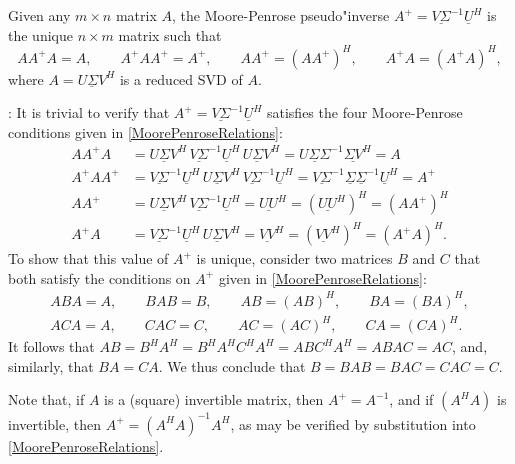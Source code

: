 \begin{fact} \label{fact.A.E.A}
Given any $m \times n$ matrix $A$, the Moore-Penrose pseudo"inverse $A^{+}=\underline{V \Sigma}^{-1} \underline{U}^{H}$
is the unique $n \times m$ matrix such that
\begin{equation}
    A A^{+} A = A, \qquad
    A^{+} A A^{+} = A^{+}, \qquad
    A A^{+} = (A A^{+})^{H}, \qquad
    A^{+} A = (A^{+} A)^{H},
    \label{MoorePenroseRelations}
\end{equation}
where $A=\underline{U \Sigma V}^{H}$ is a reduced SVD of $A$.
\end{fact}
\/: It is trivial to verify that $A^{+}=\underline{V \Sigma}^{-1} \underline{U}^{H}$ satisfies the four
Moore-Penrose conditions given in \eqref{MoorePenroseRelations}:
\begin{align*}
  A A^{+} A & = \underline{U \Sigma V}^{H} \,\underline{V \Sigma}^{-1} \underline{U}^{H}\, \underline{U \Sigma V}^{H}
              = \underline{U \Sigma \Sigma}^{-1} \underline{\Sigma V}^{H} = A\\
  A^{+} A A^{+} &= \underline{V \Sigma}^{-1} \underline{U}^{H}\, \underline{U \Sigma V}^{H}\,\underline{V \Sigma}^{-1} \underline{U}^{H}
              = \underline{V \Sigma}^{-1} \underline{\Sigma} \underline{\Sigma}^{-1} \underline{U}^{H} = A^{+}\\
  A A^{+} &= \underline{U \Sigma V}^{H}\, \underline{V \Sigma}^{-1} \underline{U}^{H} = \underline{U U}^H = (\underline{U U}^H)^H = (A A^{+})^{H} \\
  A^{+} A & = \underline{V \Sigma}^{-1} \underline{U}^{H}\,\underline{U \Sigma V}^{H} = \underline{V V}^H = (\underline{V V}^H)^H = (A^{+} A)^{H}.
\end{align*}
To show that this value of $A^+$ is unique, consider two matrices $B$ and $C$ that both satisfy the conditions on
$A^+$ given in \eqref{MoorePenroseRelations}:
\begin{gather*}
    A B A = A, \qquad B A B = B, \qquad A B = (A B)^{H}, \qquad B A = (B A)^{H}, \\
    A C A = A, \qquad C A C = C, \qquad A C = (A C)^{H}, \qquad C A = (C A)^{H}.
\end{gather*}
It follows that $AB=B^H A^H=B^H A^H C^H A^H = A B C^H A^H = ABAC=AC$, and, similarly, that $BA=CA$.  We thus conclude that
$B=BAB=BAC=CAC=C$.
\endproof \medskip
 
Note that, if $A$ is a (square) invertible matrix, then $A^{+}=A^{-1}$, and
if $(A^{H} A)$ is invertible, then $A^{+}=(A^{H} A)^{-1} A^{H}$, as may be
verified by substitution into \eqref{MoorePenroseRelations}.

